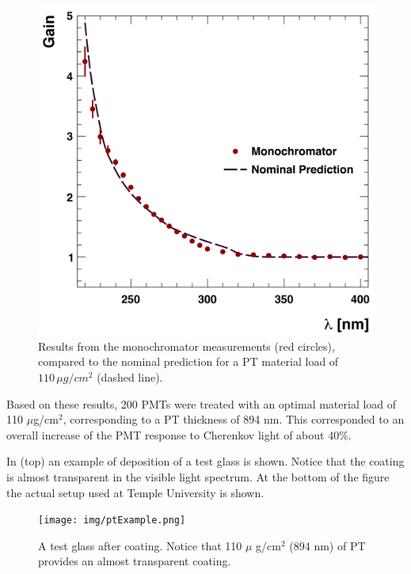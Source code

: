 \begin{figure}
	\centering
	\includegraphics[width=0.95\columnwidth,keepaspectratio]{img/ptQEResults.png}
	\caption{Results from the monochromator measurements (red circles), compared to the
				nominal prediction for a PT material load of
            $110\,\mu g/cm^2$ (dashed line).}
	\label{fig:ptQEResults}
\end{figure}

Based on these results, 200 PMTs were treated \cite{Joosten:2016lcl} with an optimal material load of 110 $\mu$g/cm$^2$,
corresponding to a PT thickness of 894 nm. This corresponded to an overall
increase of the PMT response to Cherenkov light of about 40\%.

In  (top) an example of deposition of a test glass is shown. Notice that the coating is almost
transparent in the visible light spectrum. At the bottom of the figure the actual setup used at Temple
University is shown.

\begin{figure}
	\centering
	\texttt{[image: img/ptExample.png]}
	\caption{A test glass after coating. Notice that  110 $\mu$ g/cm$^2$ (894 nm) of PT provides an
            almost transparent coating.}
	\label{fig:ptExample}
\end{figure}




